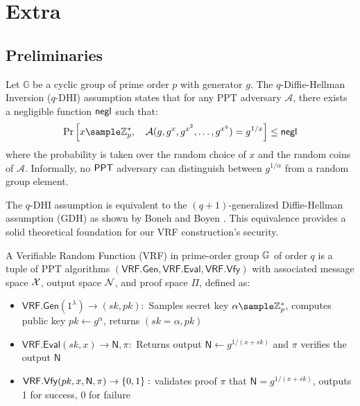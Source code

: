 \newpage
\section{Extra}




















\subsection{Preliminaries}

\begin{definition}
Let $\mathbb{G}$ be a cyclic group of prime order $p$ with generator $g$. The $q$-Diffie-Hellman Inversion ($q$-DHI) assumption \cite{mitsunari_new_2002} states that for any PPT adversary $\mathcal{A}$, there exists a negligible function $\mathsf{negl}$ such that:
\[
\Pr\left[ x \sample \Zp^*, \quad \mathcal{A}(g, g^x, g^{x^2}, \ldots, g^{x^q}) = g^{1/x} \right] \leq \negl 
\]
where the probability is taken over the random choice of $x$ and the random coins of $\mathcal{A}$. Informally, no $\mathsf{PPT}$ adversary can distinguish between $g^{1/\alpha}$ from a random group element.
\end{definition}

\begin{remark}
The $q$-DHI assumption is equivalent to the $(q+1)$-generalized Diffie-Hellman assumption (GDH) as shown by Boneh and Boyen \cite{kanade_efficient_2004}. This equivalence provides a solid theoretical foundation for our VRF construction's security.
\end{remark}




\begin{definition}
A Verifiable Random Function (VRF) in prime-order group $\mathbb{G}$ of order $q$ is a tuple of PPT algorithms $(\mathsf{VRF.Gen}, \mathsf{VRF.Eval}, \mathsf{VRF.Vfy})$ with associated message space $\mathcal{X}$, output space $\mathcal{N}$, and proof space $\Pi$, defined as:

\begin{itemize}
    \item $\mathsf{VRF.Gen}(1^\lambda) \to (sk, pk):$ Samples secret key $\alpha \sample \Zp^*$, computes public key $pk \gets g^\alpha$, returns $(sk = \alpha, pk)$
    
    \item $\mathsf{VRF.Eval}(sk, x) \to \textsf{N}, \pi:$ Returns output $\textsf{N} \gets g^{1/(x+sk)}$ and $\pi$ verifies the output $\textsf{N}$
    
    \item $\mathsf{VRF.Vfy}(pk, x, \textsf{N}, \pi) \to \{0,1\}:$ validates proof $\pi$ that $\textsf{N} = g^{1/(x+sk)}$, outputs 1 for success, 0 for failure
\end{itemize}
\end{definition}

